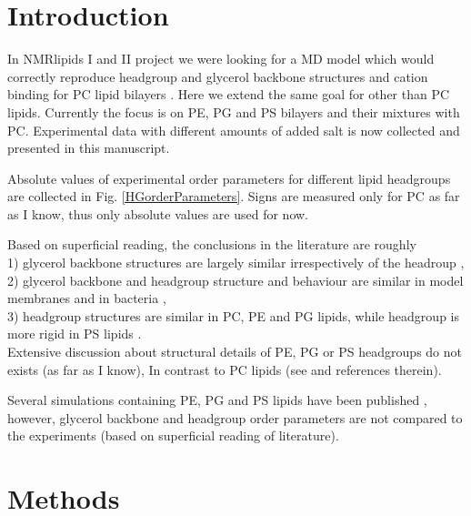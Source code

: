 \documentclass[aps,prl,superscriptaddress,twocolumn]{revtex4}
\begin{document}
\section{Introduction}

In NMRlipids I and II project we were looking for a MD model
which would correctly reproduce headgroup and glycerol
backbone structures and cation binding for PC lipid bilayers \cite{botan15,catte16}.
Here we extend the same goal for other than PC lipids.
Currently the focus is on PE, PG and PS bilayers and their
mixtures with PC. Experimental data with different amounts of 
added salt is now collected and presented in this manuscript.




Absolute values of experimental order parameters for different lipid headgroups are
collected in Fig. \ref{HGorderParameters}. Signs are measured only for PC as far as I know,
thus only absolute values are used for now.

Based on superficial reading, the conclusions in the literature are roughly \\ 
1) glycerol backbone structures are largely similar irrespectively of the headroup \cite{gally81}, \\
2) glycerol backbone and headgroup structure and behaviour are similar in model membranes and in bacteria \cite{gally81,scherer87,seelig90}, \\
3) headgroup structures are similar in PC, PE and PG lipids, while headgroup is more rigid in PS lipids \cite{wohlgemuth80,buldt81}. \\
Extensive discussion about structural details of PE, PG or PS headgroups do not exists (as far as I know), 
In contrast to PC lipids (see \cite{botan15} and references therein).



Several simulations containing PE, PG and PS lipids have been published \cite{??}, 
however, glycerol backbone and headgroup order parameters are not compared to
the experiments (based on superficial reading of literature).

\section{Methods}
\end{document}
